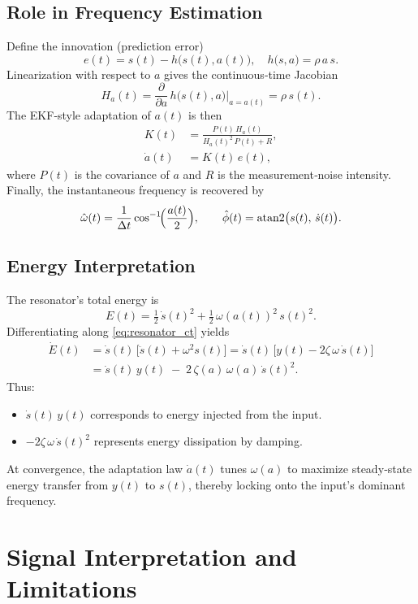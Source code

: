 \documentclass{article}
\begin{document}
\subsection{Role in Frequency Estimation}

Define the innovation (prediction error)
\[
e(t)
= s(t) - h\bigl(s(t),a(t)\bigr),
\quad
h\bigl(s,a\bigr) = \rho\,a\,s.
\]
Linearization with respect to \(a\) gives the continuous‐time Jacobian
\[
H_a(t)
= \frac{\partial}{\partial a}\,h\bigl(s(t),a\bigr)\bigg|_{a=a(t)}
= \rho\,s(t).
\]
The EKF‐style adaptation of \(a(t)\) is then
\begin{align}
K(t)
&= \frac{P(t)\,H_a(t)}{H_a(t)^2\,P(t) + R},
\\
\dot a(t)
&= K(t)\,e(t),
\end{align}
where \(P(t)\) is the covariance of \(a\) and \(R\) is the measurement‐noise intensity.  Finally, the instantaneous frequency is recovered by
\[
\hat{\omega}(t)
= \frac{1}{\Delta t}\cos^{-1}\!\Bigl(\frac{a(t)}{2}\Bigr),
\qquad
\hat{\phi}(t)
= \mathrm{atan2}\bigl(s(t),\,\dot s(t)\bigr).
\]

\subsection{Energy Interpretation}

The resonator’s total energy is
\[
E(t)
= \tfrac12\,\dot s(t)^2 + \tfrac12\,\omega(a(t))^2\,s(t)^2.
\]
Differentiating along \eqref{eq:resonator_ct} yields
\begin{align*}
\dot E(t)
&= \dot s(t)\,\bigl[\ddot s(t) + \omega^2 s(t)\bigr]
= \dot s(t)\,\bigl[y(t) - 2\zeta\,\omega\,\dot s(t)\bigr]
\\
&= \dot s(t)\,y(t)
  \;-\;2\,\zeta(a)\,\omega(a)\,\dot s(t)^2.
\end{align*}
Thus:
\begin{itemize}
  \item \(\dot s(t)\,y(t)\) corresponds to energy injected from the input.
  \item \(-2\zeta\,\omega\,\dot s(t)^2\) represents energy dissipation by damping.
\end{itemize}
At convergence, the adaptation law \(\dot a(t)\) tunes \(\omega(a)\) to maximize steady‐state energy transfer from \(y(t)\) to \(s(t)\), thereby locking onto the input’s dominant frequency.

\section{Signal Interpretation and Limitations}
\end{document}
